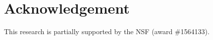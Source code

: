 \documentclass[two]{article}
\newcommand{\eg}[0]{\emph{e.g.}\xspace}
\begin{document}

\section*{Acknowledgement}

This research is partially supported by the NSF (award \#1564133).




%
\end{document}
